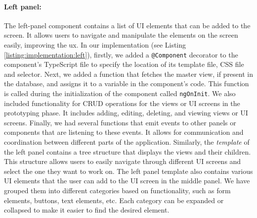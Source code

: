 \paragraph{Left panel:}
The left-panel component contains a list of UI elements that can be added to the screen.
It allows users to navigate and manipulate the elements on the screen easily, improving the \ac{ux}.
In our implementation (see Listing \ref{listing:implementation:left}), firstly, we added a \texttt{@Component} decorator to the component's TypeScript file to specify the location of its template file, CSS file and selector.
Next, we added a function that fetches the master view, if present in the database, and assigns it to a variable in the component's code. 
This function is called during the initialization of the component called \texttt{ngOnInit}. 
We also included functionality for CRUD operations for the views or UI screens in the prototyping phase. 
It includes adding, editing, deleting, and viewing views or UI screens. 
Finally, we had several functions that emit events to other panels or components that are listening to these events. 
It allows for communication and coordination between different parts of the application.
Similarly, the \textit{template} of the left panel contains a tree structure that displays the views and their children. 
This structure allows users to easily navigate through different UI screens and select the one they want to work on. 
The left panel template also contains various UI elements that the user can add to the UI screen in the middle panel.
We have grouped them into different categories based on functionality, such as form elements, buttons, text elements, etc. 
Each category can be expanded or collapsed to make it easier to find the desired element.

